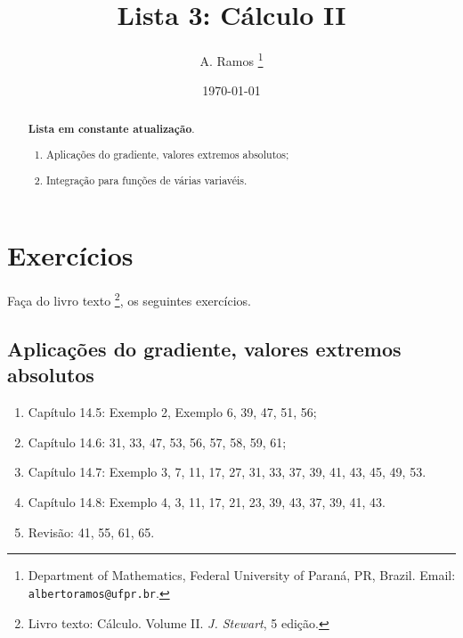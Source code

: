 \documentclass[11pt]{article}
\begin{document}
\title{Lista 3: Cálculo II }
 
\author{
A. Ramos \thanks{Department of Mathematics,
    Federal University of Paraná, PR, Brazil.
    Email: {\tt albertoramos@ufpr.br}.}
}

\date{\today}
 
\maketitle

\begin{abstract}
{\bf Lista em constante atualização}.
 \begin{enumerate}
 \item Aplicações do gradiente, valores extremos absolutos;
 \item Integração para funções de várias variavéis. 
 \end{enumerate}
\end{abstract}

 
  \section{Exercícios}   
 
 Faça do livro texto \footnote{Livro texto: Cálculo. Volume II. {\it J. Stewart}, 5 edição.}, os seguintes exercícios. 
  
    \subsection{Aplicações do gradiente, valores extremos absolutos}
     
     \begin{enumerate}
     \item Capítulo 14.5: Exemplo 2, Exemplo 6, 39, 47, 51, 56;
     \item Capítulo 14.6: 31, 33, 47, 53, 56, 57, 58, 59, 61;       \item Capítulo 14.7: Exemplo 3, 7, 11, 17, 27, 31, 33, 37, 39, 41, 43, 45, 49, 53.
      \item Capítulo 14.8: Exemplo 4, 3, 11, 17, 21, 23, 39, 43, 37, 39, 41, 43.
      \item Revisão: 41, 55, 61, 65.
     \end{enumerate}
     
\end{document}
